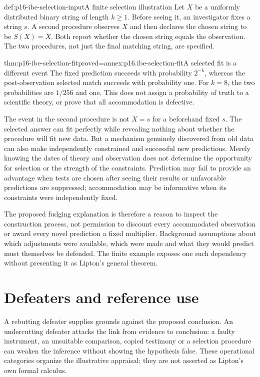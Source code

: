 \begin{hbdefinition}{def:p16-ibe-selection-input}{A finite selection illustration}
Let \(X\) be a uniformly distributed binary string of length \(k\ge1\).
Before seeing it, an investigator fixes a string \(s\). A second
procedure observes \(X\) and then declares the chosen string to be
\(S(X)=X\). Both report whether the chosen string equals the observation.
The two procedures, not just the final matching string, are specified.
\end{hbdefinition}

\begin{hbtheorem}{thm:p16-ibe-selection-fit}{proved=annex:p16.ibe-selection-fit}{A selected fit is a different event}
The fixed prediction succeeds with probability \(2^{-k}\), whereas
the post-observation selected match succeeds with probability one.
For \(k=8\), the two probabilities are \(1/256\) and one.
This does not assign a probability of truth to a scientific theory, or
prove that all accommodation is defective.
\end{hbtheorem}

The event in the second procedure is not \(X=s\) for a beforehand fixed
\(s\). The selected answer can fit perfectly while revealing nothing about
whether the procedure will fit new data. But a mechanism genuinely
discovered from old data can also make independently constrained and
successful new predictions. Merely knowing the dates of theory and
observation does not determine the opportunity for selection or the
strength of the constraints. Prediction may fail to provide an advantage
when tests are chosen after seeing their results or unfavorable predictions
are suppressed; accommodation may be informative when its constraints
were independently fixed.

The proposed fudging explanation is therefore a reason to inspect the
construction process, not permission to discount every accommodated
observation or award every novel prediction a fixed multiplier. Background
assumptions about which adjustments were available, which were made and
what they would predict must themselves be defended. The finite example
exposes one such dependency without presenting it as Lipton's general theorem.

\section{Defeaters and reference use}
\label{sec:p16-ibe-reference-use}

A rebutting defeater supplies grounds against the proposed conclusion.
An undercutting defeater attacks the link from evidence to conclusion:
a faulty instrument, an unsuitable comparison, copied testimony or a
selection procedure can weaken the inference without showing the
hypothesis false. These operational categories organize the illustrative
appraisal; they are not asserted as Lipton's own formal calculus.


